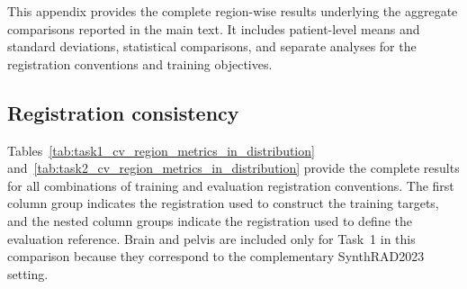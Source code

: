 \documentclass[lettersize,journal]{IEEEtran}
\begin{document}
This appendix provides the complete region-wise results underlying the aggregate comparisons reported in the main text. It includes patient-level means and standard deviations, statistical comparisons, and separate analyses for the registration conventions and training objectives.

\subsection{Registration consistency}
\label{app:registration_results}

Tables~\ref{tab:task1_cv_region_metrics_in_distribution} and~\ref{tab:task2_cv_region_metrics_in_distribution} provide the complete results for all combinations of training and evaluation registration conventions. The first column group indicates the registration used to construct the training targets, and the nested column groups indicate the registration used to define the evaluation reference. Brain and pelvis are included only for Task~1 in this comparison because they correspond to the complementary SynthRAD2023 setting.
\end{document}
